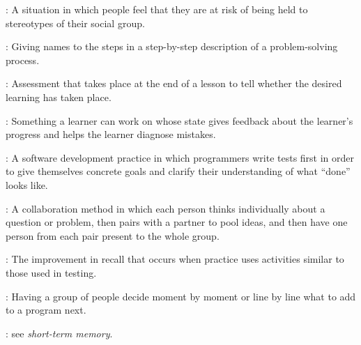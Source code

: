 \begin{description}
: A situation in
which people feel that they are at risk of being held to stereotypes of
their social group.

: Giving names to the
steps in a step-by-step description of a problem-solving process.

: Assessment
that takes place at the end of a lesson to tell whether the desired
learning has taken place.

: Something a learner
can work on whose state gives feedback about the learner's progress and
helps the learner diagnose mistakes.

: A
software development practice in which programmers write tests first in
order to give themselves concrete goals and clarify their understanding
of what ``done'' looks like.

: A collaboration
method in which each person thinks individually about a question or
problem, then pairs with a partner to pool ideas, and then have one
person from each pair present to the whole group.

:
The improvement in recall that occurs when practice uses activities
similar to those used in testing.

: Having a group of people
decide moment by moment or line by line what to add to a program next.

: see \emph{short-term memory}.

\end{description}
